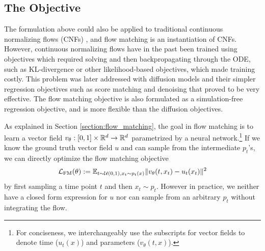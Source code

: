 \subsection{The Objective}

The formulation above could also be applied to traditional continuous normalizing flows (CNFs) \citep{chenNeuralOrdinaryDifferential2018a}, and flow matching is an instantiation of CNFs. However, continuous normalizing flows have in the past been trained using objectives which required solving and then backpropagating through the ODE, such as KL-divergence or other likelihood-based objectives, which made training costly. This problem was later addressed with diffusion models and their simpler regression objectives such as score matching and denoising \citep{sohl-dicksteinDeepUnsupervisedLearning2015, songScoreBasedGenerativeModeling2021a,hoDenoisingDiffusionProbabilistic2020} that proved to be very effective. The flow matching objective is also formulated as a simulation-free regression objective, and is more flexible than the diffusion objectives. 

As explained in Section \ref{section:flow_matching}, the goal in flow matching is to learn a vector field $v_\theta: [0,1] \times \mathbb{R}^d \to \mathbb{R}^d$ parametrized by a neural network.\footnote{For conciseness, we interchangeably use the subscripts for vector fields to denote time ($u_t(x)$) and parameters ($v_\theta(t,x)$).} If we know the ground truth vector field $u$ and can sample from the intermediate $p_t$'s, we can directly optimize the flow matching objective 
\begin{equation} \label{eq:fm_objective}
    \mathcal{L}_{\text{FM}}(\theta) := \mathbb{E}_{t \sim \mathcal{U}(0,1), x_t \sim p_t(x)} \Vert v_\theta(t, x_t) - u_t(x_t) \Vert ^2
\end{equation}
by first sampling a time point $t$ and then $x_t \sim p_t$. However in practice, we neither have a closed form expression for $u$ nor can sample from an arbitrary $p_t$ without integrating the flow. 


